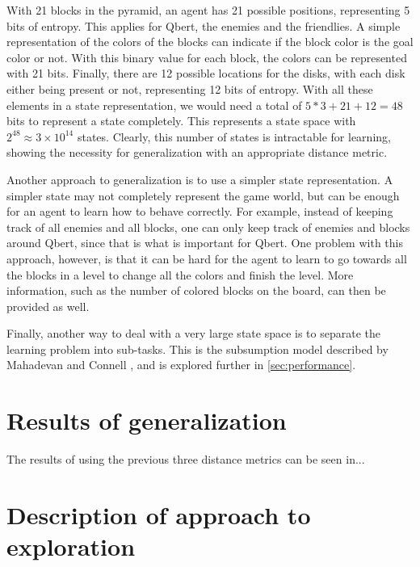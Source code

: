 \documentclass[a4paper,titlepage]{article}
\begin{document}
	With 21 blocks in the pyramid, an agent has 21 possible positions, representing 5 bits of entropy. This applies for Qbert, the enemies and the friendlies. A simple representation of the colors of the blocks can indicate if the block color is the goal color or not. With this binary value for each block, the colors can be represented with 21 bits. Finally, there are 12 possible locations for the disks, with each disk either being present or not, representing 12 bits of entropy. With all these elements in a state representation, we would need a total of $5*3 + 21 + 12 = 48$ bits to represent a state completely. This represents a state space with $2^{48} \approx 3 \times 10^{14}$ states. Clearly, this number of states is intractable for learning, showing the necessity for generalization with an appropriate distance metric.
	
	Another approach to generalization is to use a simpler state representation. A simpler state may not completely represent the game world, but can be enough for an agent to learn how to behave correctly. For example, instead of keeping track of all enemies and all blocks, one can only keep track of enemies and blocks around Qbert, since that is what is important for Qbert. One problem with this approach, however, is that it can be hard for the agent to learn to go towards all the blocks in a level to change all the colors and finish the level. More information, such as the number of colored blocks on the board, can then be provided as well.
	
	Finally, another way to deal with a very large state space is to separate the learning problem into sub-tasks. This is the subsumption model described by Mahadevan and Connell \cite{mahadevan}, and is explored further in \cref{sec:performance}.
	
	\section{Results of generalization}
	
	The results of using the previous three distance metrics can be seen in...
	
	\section{Description of approach to exploration}
	
\end{document}
